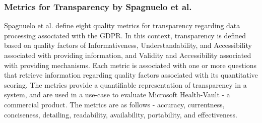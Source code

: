 \subsubsection{Metrics for Transparency by Spagnuelo et al.}
Spagnuelo et al. \cite{livraga_metrics_2016} define eight quality metrics for transparency regarding data processing associated with the GDPR.
In this context, transparency is defined based on quality factors of Informativeness, Understandability, and Accessibility associated with providing information, and Validity and Accessibility associated with providing mechanisms.
Each metric is associated with one or more questions that retrieve information regarding quality factors associated with its quantitative scoring.
The metrics provide a quantifiable representation of transparency in a system, and are used in a use-case to evaluate Microsoft Health-Vault - a commercial product.
The metrics are as follows - accuracy, currentness, conciseness, detailing, readability, availability, portability, and effectiveness.

